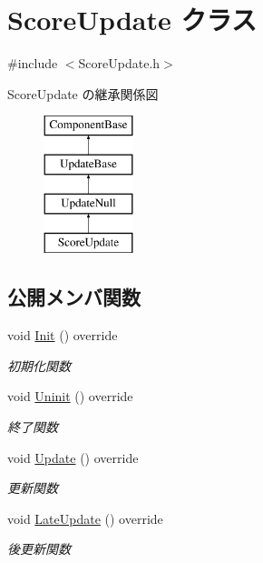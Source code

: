 \hypertarget{class_score_update}{}\section{Score\+Update クラス}
\label{class_score_update}


{\ttfamily \#include $<$Score\+Update.\+h$>$}

Score\+Update の継承関係図\begin{figure}[H]
\begin{center}
\leavevmode
\includegraphics[height=4.000000cm]{class_score_update}
\end{center}
\end{figure}
\subsection*{公開メンバ関数}
\begin{DoxyCompactItemize}
\item 
void \mbox{\hyperlink{class_score_update_afd51e11ad00ebc15d9b3139398437afc}{Init}} () override
\begin{DoxyCompactList}\small\item\em 初期化関数 \end{DoxyCompactList}\item 
void \mbox{\hyperlink{class_score_update_a701d9c84c3ef92b1c54f33b37e23605f}{Uninit}} () override
\begin{DoxyCompactList}\small\item\em 終了関数 \end{DoxyCompactList}\item 
void \mbox{\hyperlink{class_score_update_aae2b398784079a651ed92eb4c634b1c9}{Update}} () override
\begin{DoxyCompactList}\small\item\em 更新関数 \end{DoxyCompactList}\item 
void \mbox{\hyperlink{class_score_update_adc9a48f54828e49c072c298777935893}{Late\+Update}} () override
\begin{DoxyCompactList}\small\item\em 後更新関数 \end{DoxyCompactList}\end{DoxyCompactItemize}
